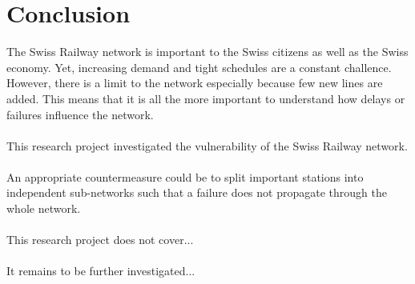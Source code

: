 \documentclass{Resources/netsci-project}
\begin{document}
\section{Conclusion}
The Swiss Railway network is important to the Swiss citizens as well as the Swiss economy. Yet, increasing demand and tight schedules are a constant challence. However, there is a limit to the network especially because few new lines are added. This means that it is all the more important to understand how delays or failures influence the network.
\\~\\
This research project investigated the vulnerability of the Swiss Railway network. 
\\~\\
An appropriate countermeasure could be to split important stations into independent sub-networks such that a failure does not propagate through the whole network. 
\\~\\
This research project does not cover...
\\~\\
It remains to be further investigated...

\printbibliography
\end{document}
